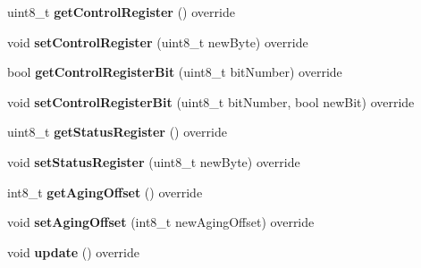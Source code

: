 \begin{DoxyCompactItemize}
uint8\+\_\+t {\bfseries get\+Control\+Register} () override
\item 
\mbox{\label{class_d_s3231_a1151a22a8dd47470b22562cedae114e9}} 
void {\bfseries set\+Control\+Register} (uint8\+\_\+t new\+Byte) override
\item 
\mbox{\label{class_d_s3231_a5b22edafc0d475fd6e33936c286654d5}} 
bool {\bfseries get\+Control\+Register\+Bit} (uint8\+\_\+t bit\+Number) override
\item 
\mbox{\label{class_d_s3231_a9ed1255adb58ecd03a541a4d481496c4}} 
void {\bfseries set\+Control\+Register\+Bit} (uint8\+\_\+t bit\+Number, bool new\+Bit) override
\item 
\mbox{\label{class_d_s3231_aee77c6ecb3c292d375eebe7e58ebb024}} 
uint8\+\_\+t {\bfseries get\+Status\+Register} () override
\item 
\mbox{\label{class_d_s3231_a303a9a5123f66987e209396d60e329e8}} 
void {\bfseries set\+Status\+Register} (uint8\+\_\+t new\+Byte) override
\item 
\mbox{\label{class_d_s3231_a94e9f40f1b453dc4d8894b63bc0ec7d6}} 
int8\+\_\+t {\bfseries get\+Aging\+Offset} () override
\item 
\mbox{\label{class_d_s3231_a0a9dc2668139654b261c2feeb1d6e663}} 
void {\bfseries set\+Aging\+Offset} (int8\+\_\+t new\+Aging\+Offset) override
\item 
\mbox{\label{class_d_s3231_a143ec57122d892ea0ec671a153352f2c}} 
void {\bfseries update} () override
\end{DoxyCompactItemize}
